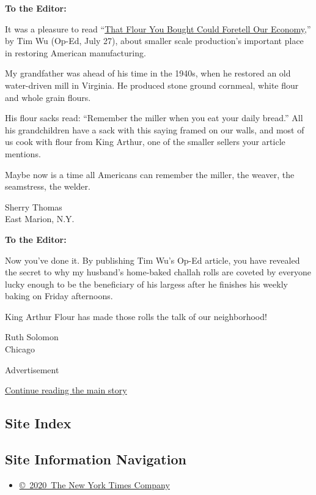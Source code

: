 \textbf{To the Editor:}

It was a pleasure to read
``\href{https://www.nytimes3xbfgragh.onion/2020/07/24/opinion/us-grain-industry.html?searchResultPosition=1}{That
Flour You Bought Could Foretell Our Economy},'' by Tim Wu (Op-Ed, July
27), about smaller scale production's important place in restoring
American manufacturing.

My grandfather was ahead of his time in the 1940s, when he restored an
old water-driven mill in Virginia. He produced stone ground cornmeal,
white flour and whole grain flours.

His flour sacks read: ``Remember the miller when you eat your daily
bread.'' All his grandchildren have a sack with this saying framed on
our walls, and most of us cook with flour from King Arthur, one of the
smaller sellers your article mentions.

Maybe now is a time all Americans can remember the miller, the weaver,
the seamstress, the welder.

Sherry Thomas\\
East Marion, N.Y.

\textbf{To the Editor:}

Now you've done it. By publishing Tim Wu's Op-Ed article, you have
revealed the secret to why my husband's home-baked challah rolls are
coveted by everyone lucky enough to be the beneficiary of his largess
after he finishes his weekly baking on Friday afternoons.

King Arthur Flour has made those rolls the talk of our neighborhood!

Ruth Solomon\\
Chicago

Advertisement

\protect\hyperlink{after-bottom}{Continue reading the main story}

\hypertarget{site-index}{%
\subsection{Site Index}\label{site-index}}

\hypertarget{site-information-navigation}{%
\subsection{Site Information
Navigation}\label{site-information-navigation}}

\begin{itemize}
\tightlist
\item
  \href{https://help.nytimes3xbfgragh.onion/hc/en-us/articles/115014792127-Copyright-notice}{©~2020~The
  New York Times Company}
\end{itemize}

